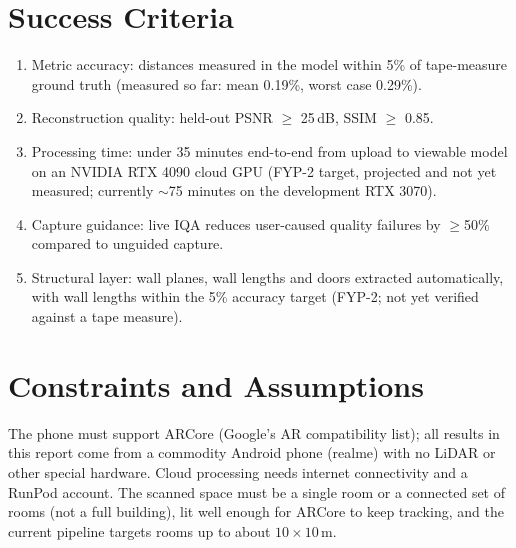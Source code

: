 \section{Success Criteria}
\label{sec:success}
\begin{enumerate}
    \item Metric accuracy: distances measured in the model within 5\% of tape-measure ground truth (measured so far: mean 0.19\%, worst case 0.29\%).
    \item Reconstruction quality: held-out PSNR $\geq$ 25\,dB, SSIM $\geq$ 0.85.
    \item Processing time: under 35 minutes end-to-end from upload to viewable model on an NVIDIA RTX 4090 cloud GPU (FYP-2 target, projected and not yet measured; currently $\sim$75 minutes on the development RTX 3070).
    \item Capture guidance: live IQA reduces user-caused quality failures by $\geq$50\% compared to unguided capture.
    \item Structural layer: wall planes, wall lengths and doors extracted automatically, with wall lengths within the 5\% accuracy target (FYP-2; not yet verified against a tape measure).
\end{enumerate}

\section{Constraints and Assumptions}
The phone must support ARCore (Google's AR compatibility list); all results in this report come from a commodity Android phone (realme) with no LiDAR or other special hardware. Cloud processing needs internet connectivity and a RunPod account. The scanned space must be a single room or a connected set of rooms (not a full building), lit well enough for ARCore to keep tracking, and the current pipeline targets rooms up to about $10 \times 10$\,m.

